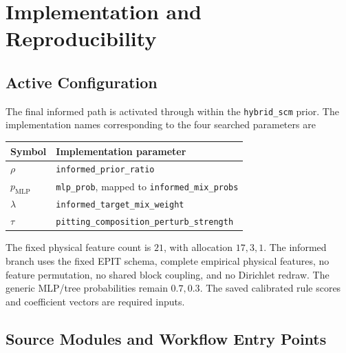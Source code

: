 \documentclass{article}
\begin{document}
\section{Implementation and Reproducibility}
\label{app:implementation}

\subsection{Active Configuration}

The final informed path is activated through
 within the
\texttt{hybrid\_scm} prior. The implementation names corresponding to the
four searched parameters are
\begin{center}
\begin{tabular}{ll}
\toprule
Symbol & Implementation parameter \\
\midrule
\(\rho\) & \texttt{informed\_prior\_ratio} \\
\(p_{\mathrm{MLP}}\) & \texttt{mlp\_prob}, mapped to
\texttt{informed\_mix\_probs} \\
\(\lambda\) & \texttt{informed\_target\_mix\_weight} \\
\(\tau\) & \texttt{pitting\_composition\_perturb\_strength} \\
\bottomrule
\end{tabular}
\end{center}

The fixed physical feature count is \(21\), with allocation \(17,3,1\).
The informed branch uses the fixed EPIT schema, complete empirical physical
features, no feature permutation, no shared block coupling, and no Dirichlet
redraw. The generic MLP/tree probabilities remain \(0.7,0.3\). The saved
calibrated rule scores and coefficient vectors are required inputs.

\subsection{Source Modules and Workflow Entry Points}
\end{document}
